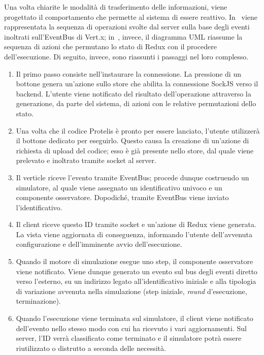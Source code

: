       Una volta chiarite le modalità di trasferimento delle informazioni, viene progettato il comportamento che permette al sistema di essere reattivo.
      In~ viene rappresentata la sequenza di operazioni svolte dal server sulla base degli eventi inoltrati sull'EventBus di Vert.x;
      in~, invece, il diagramma UML riassume la sequenza di azioni che permutano lo stato di Redux con il procedere dell'esecuzione.
      Di seguito, invece, sono riassunti i passaggi nel loro complesso.

      \begin{enumerate}
        \item
          Il primo passo consiste nell'instaurare la connessione.
          La pressione di un bottone genera un'azione sullo store che abilita la connessione SockJS verso il backend.
          L'utente viene notificato del risultato dell'operazione attraverso la generazione, da parte del sistema, di azioni con le relative permutazioni dello stato.
        \item
          Una volta che il codice Protelis è pronto per essere lanciato, l'utente utilizzerà il bottone dedicato per eseguirlo.
          Questo causa la creazione di un'azione di richiesta di upload del codice;
          esso è già presente nello store, dal quale viene prelevato e inoltrato tramite socket al server.
        \item
          Il verticle riceve l'evento tramite EventBus;
          procede dunque costruendo un simulatore, al quale viene assegnato un identificativo univoco e un componente osservatore.
          Dopodiché, tramite EventBus viene inviato l'identificativo.
        \item
          Il client riceve questo ID tramite socket e un'azione di Redux viene generata.
          La vista viene aggiornata di conseguenza, informando l'utente dell'avvenuta configurazione e dell'imminente avvio dell'esecuzione.
        \item
          Quando il motore di simulazione esegue uno step, il componente osservatore viene notificato.
          Viene dunque generato un evento sul bus degli eventi diretto verso l'esterno, su un indirizzo legato all'identificativo iniziale e alla tipologia di variazione avvenuta nella simulazione (step iniziale, \emph{round} d'esecuzione, terminazione).
        \item
          Quando l'esecuzione viene terminata sul simulatore, il client viene notificato dell'evento nello stesso modo con cui ha ricevuto i vari aggiornamenti.
          Sul server, l'ID verrà classificato come terminato e il simulatore potrà essere riutilizzato o distrutto a seconda delle necessità.
      \end{enumerate}

